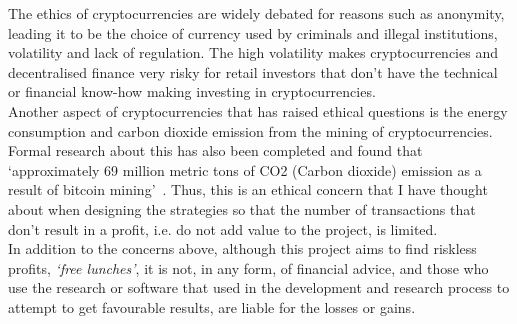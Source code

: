 The ethics of cryptocurrencies are widely debated for reasons such as anonymity, leading it to be the choice of currency used by criminals and illegal institutions, volatility and lack of regulation. The high volatility makes cryptocurrencies and decentralised finance very risky for retail investors that don't have the technical or financial know-how making investing in cryptocurrencies.
\\[3mm]
Another aspect of cryptocurrencies that has raised ethical questions is the energy consumption and carbon dioxide emission from the mining of cryptocurrencies. Formal research about this has also been completed and found that `approximately 69 million metric tons of CO2 (Carbon dioxide) emission as a result of bitcoin mining'~\cite{egiyi2020cryptocurrency}. Thus, this is an ethical concern that I have thought about when designing the strategies so that the number of transactions that don't result in a profit, i.e. do not add value to the project, is limited.
\\[3mm]
In addition to the concerns above, although this project aims to find riskless profits, \textit{`free lunches'}, it is not, in any form, of financial advice, and those who use the research or software that used in the development and research process to attempt to get favourable results, are liable for the losses or gains. 
